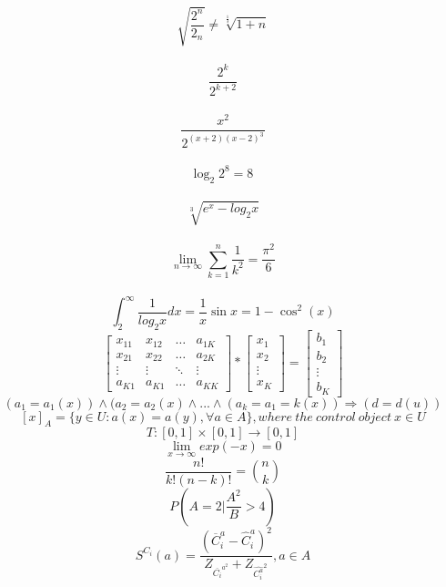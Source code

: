 \documentclass[12pt, letterpaper, titlepage]{article}
\begin{document}
$$ \sqrt{ \frac{2^{n}}{2_n}} \neq \sqrt[\frac{1}{3}]{1+n} $$\\
$$ \frac{2^{k}}{2^{k+2}} $$\\
$$ \frac{x^{2}}{2^{(x+2)(x-2)^3}} $$\\
$$ \log_{2}2^{8}=8 \ $$\\ 
$$ \sqrt[3]{e^{x}-log_{2}x} $$\\
$$ \lim_{n\rightarrow\infty}\sum_{k=1}^{n} \frac{1}{k^2}= \frac{\pi^{2}}{6}$$\\
$$ \int_{2}^{\infty}\frac{1}{log_{2}x}dx=\frac{1}{x}\sin{x}=1-\cos^{2}(x)$$
$$\mathbf{}
\left[ \begin{array}{cccc}
x_{11} & x_{12} & \ldots & a_{1K} \\ 
x_{21} & x_{22} & \ldots & a_{2K} \\
\vdots & \vdots & \ddots & \vdots \\
a_{K1} & a_{K1} & \ldots & a_{KK}
\end{array} \right]
*
\mathbf{}
\left[ \begin{array}{c}
x_{1} \\ 
x_{2} \\
\vdots\\
x_{K} 
\end{array} \right]
=
\mathbf{}
\left[ \begin{array}{c}
b_{1} \\ 
b_{2} \\
\vdots\\
b_{K} 
\end{array} \right]$$
$$(a_1=a_1(x)) \wedge (a_2=a_2(x) \wedge ... \wedge (a_k=a_1=k(x))\Rightarrow (d=d(u))$$
$$[x]_A=\{y\in U:a(x)=a(y),\forall a \in A\}, where \ the \ control \ object \ x \in U$$
$$T:[0,1]\times[0,1]\rightarrow[0,1]$$
$$\lim_{x\rightarrow\infty} exp(-x)=0 $$
$$\frac{n!}{k!(n-k)!} =  {n \choose k} $$
$$P\left(A=2\bigg|\frac{A^2}{B}>4\right)$$
$$S^{C_i}(a)=\frac{(\overline{C}^{a}_i-\hat{C}^a_i)^2}{Z_{\overline{{C_i}}^{a^2}}+Z_{\hat{C^a_i}^2}},a \in A$$
\end{document}
